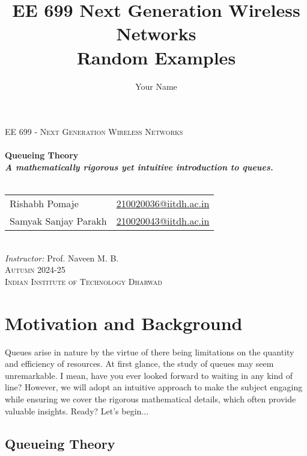 \documentclass[11pt, a4paper]{report}
\title{\Huge{EE 699 Next Generation Wireless Networks}\\ Random Examples}
\author{\huge{Your Name}}
\date{}
\begin{document}
\vspace*{\fill}
\begin{center}
    \textsc{\LARGE EE 699 - Next Generation Wireless Networks}\\[0.6cm]
    \noindent\makebox[\linewidth]{\rule{0.7\paperwidth}{0.6pt}}\\[0.8cm]

    { \Huge \bfseries Queueing Theory \\[0.4cm] \Large \textit{A mathematically rigorous yet intuitive introduction to queues.}}\\[0.3cm]
    \noindent\makebox[\linewidth]{\rule{0.7\paperwidth}{0.6pt}}\\[0.8cm]

    \begin{tabular}{l l}
        \Large Rishabh Pomaje & \Large \href{mailto:210020036@iitdh.ac.in}{210020036@iitdh.ac.in} \\[0.5cm]
        \Large Samyak Sanjay Parakh & \Large \href{mailto:210020043@iitdh.ac.in}{210020043@iitdh.ac.in} \\[1.5cm]
    \end{tabular}\\
    \Large \textit{Instructor: }Prof. Naveen M. B.\\[5cm]

    \textsc{\Large Autumn 2024-25\\[0.3cm] Indian Institute of Technology Dharwad}
\end{center}
\vspace*{\fill}


\newpage%

\tableofcontents
\pagebreak

\chapter{Motivation and Background}
Queues arise in nature by the virtue of there being limitations on the quantity and efficiency of resources. At first glance, the study of queues may seem unremarkable. I mean, have you ever looked forward to waiting in any kind of line? However, we will adopt an intuitive approach to make the subject engaging while ensuring we cover the rigorous mathematical details, which often provide valuable insights. Ready? Let's begin...

\section{Queueing Theory}
\end{document}
